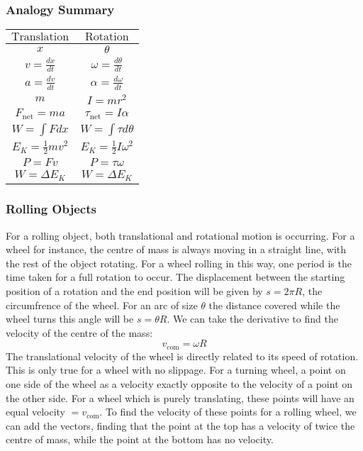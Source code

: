 \documentclass[12pt]{report}
\begin{document}
\begin{flushleft}
\subsubsection*{Analogy Summary}
\begin{center}
    \begin{tabular}{c|c}
        \(\mathrm{Translation}\) & \(\mathrm{Rotation}\) \\
        \hline
        \(x\) & \(\theta\) \\[7pt]
        \(v = \frac{dx}{dt}\) & \(\omega = \frac{d\theta}{dt}\) \\[7pt]
        \(a = \frac{dv}{dt}\) & \(\alpha = \frac{d\omega}{dt}\) \\[7pt]
        \(m\) & \(I = mr^2\) \\[7pt]
        \(F_\mathrm{net} = ma\) & \(\tau_\mathrm{net} = I\alpha\) \\[7pt]
        \(W = \int Fdx\) & \(W = \int\tau d\theta\) \\[7pt]
        \(E_K = \frac{1}{2}mv^2\) & \(E_K = \frac{1}{2}I\omega^2\) \\[7pt]
        \(P = Fv\) & \(P = \tau\omega\) \\[7pt]
        \(W = \Delta E_K\) & \(W = \Delta E_K\) \\[7pt]        
    \end{tabular}        
\end{center}

\subsubsection*{Rolling Objects}
For a rolling object, both translational and rotational motion is occurring.
For a wheel for instance, the centre of mass is always moving in a straight
line, with the rest of the object rotating. For a wheel rolling in this way,
one period is the time taken for a full rotation to occur. The displacement
between the starting position of a rotation and the end position will be given
by \(s = 2\pi R\), the circumfrence of the wheel. For an arc of size \(\theta\)
the distance covered while the wheel turns this angle will be \(s = \theta R\).
We can take the derivative to find the velocity of the centre of the mass:
\[v_\mathrm{com} = \omega R\]
The translational velocity of the wheel is directly related to its speed of
rotation. This is only true for a wheel with no slippage. For a turning wheel,
a point on one side of the wheel as a velocity exactly opposite to the velocity
of a point on the other side. For a wheel which is purely translating, these
points will have an equal velocity \(= v_\mathrm{com}\). To find the velocity
of these points for a rolling wheel, we can add the vectors, finding that
the point at the top has a velocity of twice the centre of mass, while the
point at the bottom has no velocity.


\end{flushleft}
\end{document}
